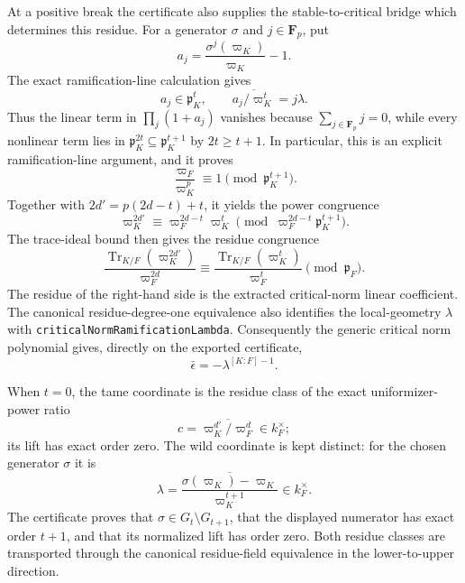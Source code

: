 \begin{theorem}
At a positive break the certificate also supplies the stable-to-critical
bridge which determines this residue.  For a generator $\sigma$ and
$j\in\mathbf F_p$, put
\[
  a_j=\frac{\sigma^j(\varpi_K)}{\varpi_K}-1.
\]
The exact ramification-line calculation gives
\[
  a_j\in\mathfrak p_K^t,
  \qquad
  \overline{a_j/\varpi_K^t}=j\lambda.
\]
Thus the linear term in $\prod_j(1+a_j)$ vanishes because
$\sum_{j\in\mathbf F_p}j=0$, while every nonlinear term lies in
$\mathfrak p_K^{2t}\subseteq\mathfrak p_K^{t+1}$ by
$2t\geq t+1$.  In particular, this is an explicit ramification-line
argument, and it proves
\[
  \frac{\varpi_F}{\varpi_K^p}\equiv1
  \pmod{\mathfrak p_K^{t+1}}.
\]
Together with $2d'=p(2d-t)+t$, it yields the power congruence
\[
  \varpi_K^{2d'}\equiv
  \varpi_F^{2d-t}\varpi_K^t
  \pmod{\varpi_F^{2d-t}\mathfrak p_K^{t+1}}.
\]
The trace-ideal bound then gives the residue congruence
\[
  \frac{\operatorname{Tr}_{K/F}(\varpi_K^{2d'})}{\varpi_F^{2d}}
  \equiv
  \frac{\operatorname{Tr}_{K/F}(\varpi_K^t)}{\varpi_F^t}
  \pmod{\mathfrak p_F}.
\]
The residue of the right-hand side is the extracted critical-norm linear
coefficient.  The canonical residue-degree-one equivalence also identifies
the local-geometry $\lambda$ with
\texttt{criticalNormRamificationLambda}.  Consequently the generic critical
norm polynomial gives, directly on the exported certificate,
\[
  \bar\epsilon=-\lambda^{[K:F]-1}.
\]

When $t=0$, the tame coordinate is the residue class of the exact
uniformizer-power ratio
\[
 c=\overline{\varpi_K^{d'}/\varpi_F^d}\in k_F^\times;
\]
its lift has exact order zero.  The wild coordinate is kept distinct:
for the chosen generator $\sigma$ it is
\[
 \lambda=\overline{
   \frac{\sigma(\varpi_K)-\varpi_K}{\varpi_K^{t+1}}}\in k_F^\times.
\]
The certificate proves that $\sigma\in G_t\setminus G_{t+1}$, that the
displayed numerator has exact order $t+1$, and that its normalized lift has
order zero.  Both residue classes are transported through the canonical
residue-field equivalence in the lower-to-upper direction.


\end{theorem}
